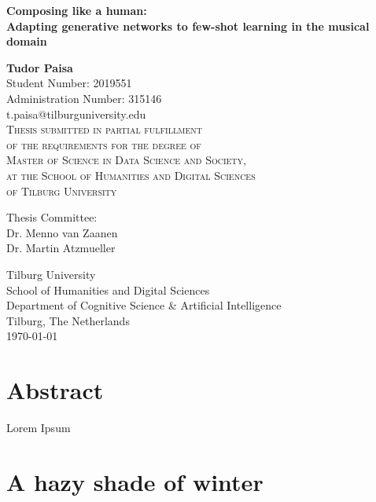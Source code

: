\documentclass[a4paper]{book}
\begin{document}
\begin{titlepage}
    \begin{center}
        \huge\textbf{Composing like a human:} \\
        \Large\textbf{Adapting generative networks to few-shot learning in the musical domain}
        \normalsize

        \vspace{1cm}

        \textbf{Tudor Paisa}\\
        Student Number: 2019551 \\
        Administration Number: 315146\\
        t.paisa@tilburguniversity.edu\\

        \vspace{1cm}
        \textsc{Thesis submitted in partial fulfillment\\
        of the requirements for the degree of\\
        Master of Science in Data Science and Society,\\
        at the School of Humanities and Digital Sciences\\
        of Tilburg University\\}

        \vspace{2cm}
        Thesis Committee:\\
        Dr. Menno van Zaanen\\
        Dr. Martin Atzmueller\\
        \vfill

        Tilburg University\\
        School of Humanities and Digital Sciences\\
        Department of Cognitive Science \& Artificial Intelligence\\
        Tilburg, The Netherlands\\
        \today
 
    \end{center}
\end{titlepage}

\chapter*{Abstract}
    Lorem Ipsum

\tableofcontents

\chapter{A hazy shade of winter}
\end{document}
